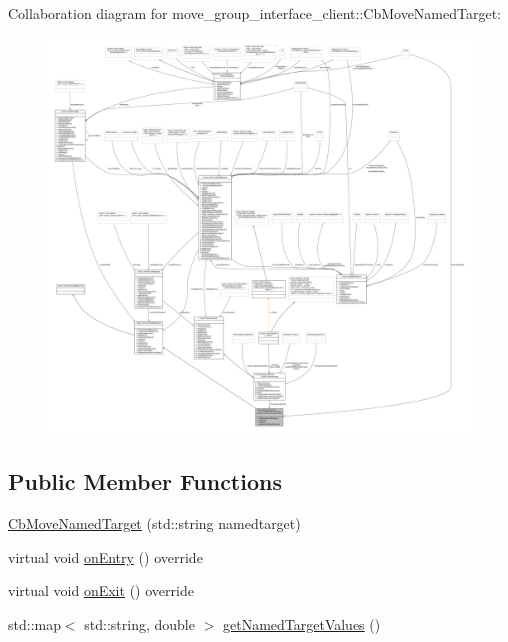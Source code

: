 Collaboration diagram for move\+\_\+group\+\_\+interface\+\_\+client\+:\+:Cb\+Move\+Named\+Target\+:
\nopagebreak
\begin{figure}[H]
\begin{center}
\leavevmode
\includegraphics[width=350pt]{classmove__group__interface__client_1_1CbMoveNamedTarget__coll__graph}
\end{center}
\end{figure}
\subsection*{Public Member Functions}
\begin{DoxyCompactItemize}
\item 
\hyperlink{classmove__group__interface__client_1_1CbMoveNamedTarget_a5046a083fb5fddc968867f50f2e778b6}{Cb\+Move\+Named\+Target} (std\+::string namedtarget)
\item 
virtual void \hyperlink{classmove__group__interface__client_1_1CbMoveNamedTarget_afe138151340dafa14cb88051e82f0c8e}{on\+Entry} () override
\item 
virtual void \hyperlink{classmove__group__interface__client_1_1CbMoveNamedTarget_a239d351bb9c2b579cc19ee993c792d2d}{on\+Exit} () override
\item 
std\+::map$<$ std\+::string, double $>$ \hyperlink{classmove__group__interface__client_1_1CbMoveNamedTarget_acd3ec1b41ad37f2d441b66cdedc63b95}{get\+Named\+Target\+Values} ()
\end{DoxyCompactItemize}
